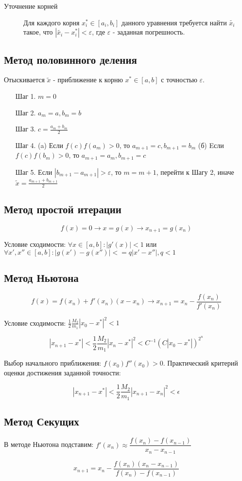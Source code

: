 \documentclass[../main.tex]{subfiles}
\begin{document}
\begin{description}
    \item[Уточнение корней] Для каждого корня $x_i^* \in [a_i,b_i]$ данного уравнения требуется найти $\tilde{x_i}$ такое, что $|\tilde{x_i} - x_i^*| < \varepsilon$, где $\varepsilon$ - заданная погрешность.
\end{description}


\subsection{Метод половинного деления}

Отыскивается $\tilde{x}$ - приближение к корню $x^* \in [a, b]$ с точностью $\varepsilon$.

\begin{itemize}
    \item[Шаг 1.] $ m = 0 $
    \item[Шаг 2.] $ a_m = a, b_m = b $
    \item[Шаг 3.] $ c= \frac{a_m + b_m}{2} $
    \item[Шаг 4.] (a) Если $f(c)f(a_m) > 0$, то $a_{m+1} = c, b_{m+1} = b_m$
        (б) Eсли $f(c)f(b_m) > 0$, то $a_{m+1} = a_m, b_{m+1} = c$
    \item[Шаг 5.] Если $|b_{m+1} - a_{m+1}| > \varepsilon$, то $m = m + 1$, перейти к Шагу 2, иначе $\tilde{x} = \frac{a_{m+1} + b_{m+1}}{2}$
\end{itemize}

\subsection{Метод простой итерации}

$$
f(x) = 0 \to x = g(x) \to x_{n+1} = g(x_n)
$$

Условие сходимости: $\forall x \in [a, b]: |g'(x)| < 1$ или $\forall x', x'' \in [a, b]: |g(x') - g(x'')| <= q|x' - x''|, q < 1$

\subsection{Метод Ньютона}

$$
f(x) = f(x_n) + f'(x_n)(x - x_n) \to x_{n+1} = x_n - \frac{f(x_n)}{f'(x_n)}
$$

Условие сходимости: $\frac{1}{2} \frac{M_2}{m_1} |x_0 - x^*|^2 < 1$

$$
|x_{n+1} - x^*| < \frac{1}{2}\frac{M_2}{m_1}|x_n - x^*|^2 < C^{-1}(C|x_0 - x^*|)^{2^n}
$$

Выбор начального приближения: $f(x_0)f''(x_0) > 0$.
Практический критерий оценки достижения заданной точности:

$$
|x_{n+1} - x^*| < \frac{1}{2}\frac{M_2}{m_1}|x_{n+1} - x_n|^2 < \epsilon
$$

\subsection{Метод Секущих}

В методе Ньютона подставим: $f'(x_n) \approx \dfrac{f(x_n) - f(x_{n-1})}{x_n - x_{n-1}}$

$$ x_{n+1} = x_n - \frac{f(x_n)(x_n - x_{n-1})}{f(x_n) - f(x_{n-1})} $$
\end{document}
